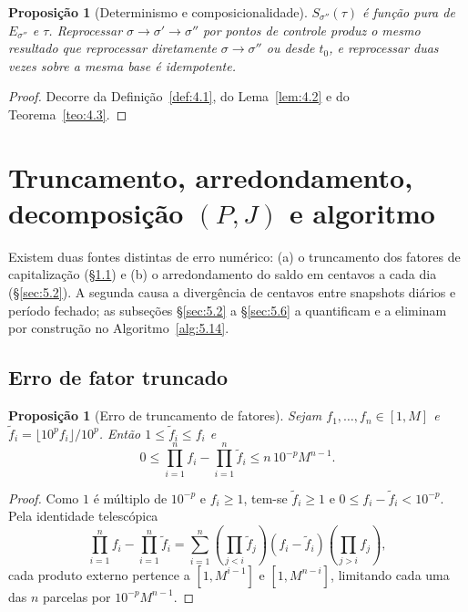 \documentclass[11pt, a4paper]{article}
\theoremstyle{definition}
\theoremstyle{plain}
\newtheorem{proposicao}[definicao]{Proposição}
\theoremstyle{remark}
\begin{document}
\begin{proposicao}[Determinismo e composicionalidade]\label{prop:4.9}
$S_{\sigma''}(\tau)$ é função pura de $E_{\sigma''}$ e $\tau$. Reprocessar $\sigma \to \sigma' \to \sigma''$ por pontos de controle produz o mesmo resultado que reprocessar diretamente $\sigma \to \sigma''$ ou desde $t_0$, e reprocessar duas vezes sobre a mesma base é idempotente.
\end{proposicao}
\begin{proof}
Decorre da Definição~\ref{def:4.1}, do Lema~\ref{lem:4.2} e do Teorema~\ref{teo:4.3}.
\end{proof}

\section{Truncamento, arredondamento, decomposição $(P, J)$ e algoritmo}\label{sec:5}

Existem duas fontes distintas de erro numérico: (a) o truncamento dos fatores de capitalização (\S\ref{sec:5.1}) e (b) o arredondamento do saldo em centavos a cada dia (\S\ref{sec:5.2}). A segunda causa a divergência de centavos entre snapshots diários e período fechado; as subseções \S\ref{sec:5.2} a \S\ref{sec:5.6} a quantificam e a eliminam por construção no Algoritmo~\ref{alg:5.14}.

\subsection{Erro de fator truncado}\label{sec:5.1}

\begin{proposicao}[Erro de truncamento de fatores]\label{prop:5.1}
Sejam $f_1, \dots, f_n \in [1, M]$ e $\tilde{f}_i = \lfloor 10^p f_i \rfloor / 10^p$. Então $1 \le \tilde{f}_i \le f_i$ e
\[
0 \le \prod_{i=1}^{n} f_i - \prod_{i=1}^{n} \tilde{f}_i \le n \, 10^{-p} M^{n-1}.
\]
\end{proposicao}
\begin{proof}
Como $1$ é múltiplo de $10^{-p}$ e $f_i \ge 1$, tem-se $\tilde{f}_i \ge 1$ e $0 \le f_i - \tilde{f}_i < 10^{-p}$. Pela identidade telescópica
\[
\prod_{i=1}^{n} f_i - \prod_{i=1}^{n} \tilde{f}_i = \sum_{i=1}^{n} \left(\prod_{j < i} \tilde{f}_j\right) (f_i - \tilde{f}_i) \left(\prod_{j > i} f_j\right),
\]
cada produto externo pertence a $[1, M^{i-1}]$ e $[1, M^{n-i}]$, limitando cada uma das $n$ parcelas por $10^{-p} M^{n-1}$.
\end{proof}
\end{document}
